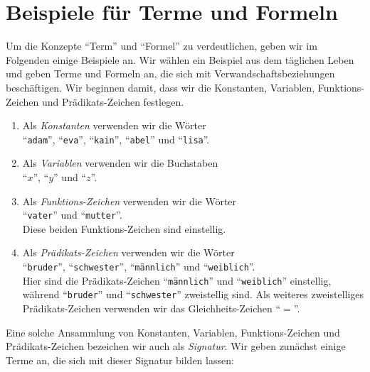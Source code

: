 \section{Beispiele f\"ur Terme und Formeln}
Um die Konzepte ``Term'' und ``Formel'' zu verdeutlichen, geben wir im Folgenden einige
Beispiele an.  Wir w\"ahlen ein Beispiel aus dem t\"aglichen Leben und geben Terme und Formeln an, die sich mit
Verwandschaftsbeziehungen besch\"aftigen.  Wir beginnen damit, dass wir die Konstanten,
Variablen, Funktions-Zeichen und Pr\"adikats-Zeichen festlegen.
\begin{enumerate}
\item Als \emph{Konstanten} verwenden wir die W\"orter \\[0.2cm]
      \hspace*{1.3cm} ``\texttt{adam}'', ``\texttt{eva}'', ``\texttt{kain}'', ``\texttt{abel}'' und
      ``\texttt{lisa}''.
\item Als \emph{Variablen} verwenden wir die Buchstaben \\[0.2cm]
      \hspace*{1.3cm} ``$x$'', ``$y$'' und ``$z$''.
\item Als \emph{Funktions-Zeichen} verwenden wir die W\"orter \\[0.2cm]
      \hspace*{1.3cm} ``\texttt{vater}'' und ``\texttt{mutter}''. \\[0.2cm]
      Diese beiden Funktions-Zeichen sind einstellig. 
\item Als \emph{Pr\"adikats-Zeichen} verwenden wir die W\"orter \\[0.2cm]
      \hspace*{1.3cm} ``\texttt{bruder}'', ``\texttt{schwester}'', 
      ``\texttt{m\"annlich}'' und ``\texttt{weiblich}''. \\[0.2cm]
      Hier sind die Pr\"adikats-Zeichen ``\texttt{m\"annlich}'' und ``\texttt{weiblich}'' einstellig,
      w\"ahrend ``\texttt{bruder}'' und ``\texttt{schwester}'' zweistellig sind. 
      Als weiteres zweistelliges Pr\"adikats-Zeichen verwenden wir das Gleichheits-Zeichen ``$=$''.
\end{enumerate}
Eine solche Ansammlung von Konstanten,
Variablen, Funktions-Zeichen und Pr\"adikats-Zeichen bezeichen wir auch als
\emph{Signatur}.  Wir geben zun\"achst einige Terme an, die sich mit dieser Signatur
bilden lassen:
